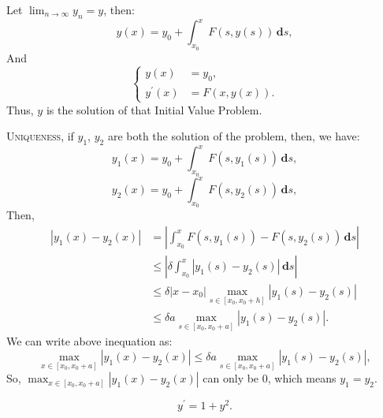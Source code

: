 \documentclass[en, normal, 11pt, black]{elegantnote}
\newenvironment{exercise}[1]{\begin{tcolorbox}[colback=black!15, colframe=black!80, breakable, title=#1]}{\end{tcolorbox}}
\renewenvironment{proof}{\begin{tcolorbox}[colback=white, colframe=black!50, breakable, title=Proof. ]\setlength{\parskip}{0.8em}}{\,\\\rightline{$\square$}\end{tcolorbox}}
\newcommand{\der}{\,\mathbf{d}}
\begin{document}
\begin{proof}
        Let $\lim_{n\to\infty}y_n=y$, then: 
        \[y(x)=y_0+\int_{x_0}^xF(s,y(s))\der s, \]
        And 
        \begin{equation*}
            \left\{
                \begin{aligned}
                    y(x)&=y_0, \\
                    y^\prime(x)&=F(x, y(x)). 
                \end{aligned}
            \right.
        \end{equation*}
        Thus, $y$ is the solution of that Initial Value Problem. 

        \textsc{Uniqueness}, if $y_1$, $y_2$ are both the solution of the problem, then, we have: 
        \[y_1(x)=y_0+\int_{x_0}^xF(s,y_1(s))\der s, \]
        \[y_2(x)=y_0+\int_{x_0}^xF(s,y_2(s))\der s, \]
        Then, 
        \begin{align*}
            |y_1(x)-y_2(x)|&=\left|\int_{x_0}^xF(s,y_1(s))-F(s,y_2(s))\der s\right|\\
            &\leqslant\left|\delta\int_{x_0}^x|y_1(s)-y_2(s)|\der s\right|\\
            &\leqslant\delta |x-x_0| \max_{s\in [x_0,x_0+h]}|y_1(s)-y_2(s)|\\
            &\leqslant \delta a \max_{s\in [x_0,x_0+a]}|y_1(s)-y_2(s)|. 
        \end{align*}
        We can write above inequation as: 
        \[\max_{x\in [x_0, x_0+a]}|y_1(x)-y_2(x)|\leqslant \delta a \max_{s\in [x_0,x_0+a]}|y_1(s)-y_2(s)|, \]
        So, $\max_{x\in [x_0, x_0+a]}|y_1(x)-y_2(x)|$ can only be $0$, which means $y_1=y_2$. 
    \end{proof}
    \begin{exercise}{\textsc{Exercise. }1}
        \[y^\prime=1+y^2.\]
    \end{exercise}
\end{document}
